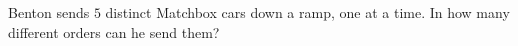 Benton sends $5$ distinct Matchbox cars down a ramp, one at a time. In how many different orders can he send them?
